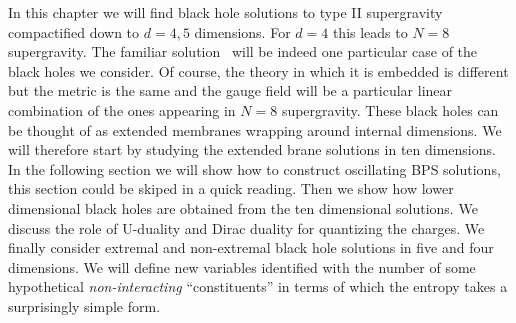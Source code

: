 In this chapter we will find black hole solutions
to type II supergravity compactified down to 
$d = 4,5$ dimensions. For $d=4$ this leads to 
 $N=8$ 
supergravity. 
 The familiar solution 
\renof\ will be indeed one particular case of 
the black holes we consider. Of course,
the theory in which it is embedded is different
but the metric is the same and the gauge field
will be a particular linear combination of the
ones appearing in $N=8$ supergravity.  
These black holes can be thought of as 
extended membranes wrapping around internal 
dimensions. We will therefore start by studying
the extended brane solutions in ten dimensions.
In the following section we will show how
to construct oscillating 
BPS solutions,
this section could be skiped in a quick reading.
Then we show how lower dimensional black holes 
are obtained from the ten dimensional  solutions. We discuss
the role of U-duality and  Dirac duality 
for  quantizing the charges. 
We finally consider extremal and non-extremal 
black hole solutions in five and four dimensions.
We will  define new variables identified with the number of   
some hypothetical   {\it non-interacting}
 ``constituents'' in terms of
 which the entropy takes a surprisingly simple form.







